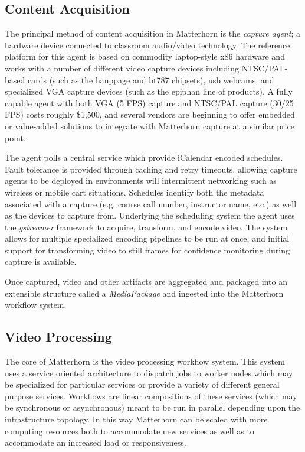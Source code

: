 \documentclass{sig-alternate}
\begin{document}
\subsection{Content Acquisition}
The principal method of content acquisition in Matterhorn is the \emph{capture agent}; a hardware device connected to classroom audio/video technology.  The reference platform for this agent is based on commodity laptop-style x86 hardware and works with a number of different video capture devices including NTSC/PAL-based cards (such as the hauppage and bt787 chipsets), usb webcams, and specialized VGA capture devices (such as the epiphan line of products).  A fully capable agent with both VGA (5 FPS) capture and NTSC/PAL capture (30/25 FPS) costs roughly \$1,500, and several vendors are beginning to offer embedded or value-added solutions to integrate with Matterhorn capture at a similar price point.

The agent polls a central service which provide iCalendar encoded schedules.  Fault tolerance is provided through caching and retry timeouts, allowing capture agents to be deployed in environments will intermittent networking such as wireless or mobile cart situations.  Schedules identify both the metadata associated with a capture (e.g. course call number, instructor name, etc.) as well as the devices to capture from.  Underlying the scheduling system the agent uses the \emph{gstreamer} framework to acquire, transform, and encode video.  The system allows for multiple specialized encoding pipelines to be run at once, and initial support for transforming video to still frames for confidence monitoring during capture is available.

Once captured, video and other artifacts are aggregated and packaged into an extensible structure called a \emph{MediaPackage} and ingested into the Matterhorn workflow system.

\subsection{Video Processing}
The core of Matterhorn is the video processing workflow system.  This system uses a service oriented architecture to dispatch jobs to worker nodes which may be specialized for particular services or provide a variety of different general purpose services.  Workflows are linear compositions of these services (which may be synchronous or asynchronous) meant to be run in parallel depending upon the infrastructure topology.  In this way Matterhorn can be scaled with more computing resources both to accommodate new services as well as to accommodate an increased load or responsiveness.
\end{document}
